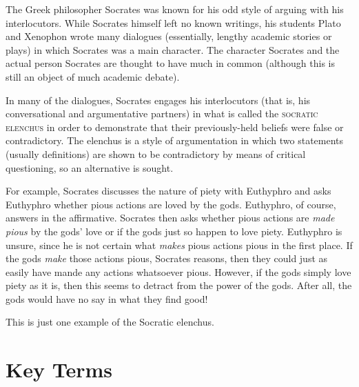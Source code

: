 The Greek philosopher Socrates was known for his odd style of arguing with his interlocutors. While Socrates himself left no known writings, his students Plato and Xenophon wrote many dialogues (essentially, lengthy academic stories or plays) in which Socrates was a main character. The character Socrates and the actual person Socrates are thought to have much in common (although this is still an object of much academic debate).

In many of the dialogues, Socrates engages his interlocutors (that is, his conversational and argumentative partners) in what is called the \textsc{\Gls{socratic elenchus}} \label{def:socraticelenchus} in order to demonstrate that their previously-held beliefs were false or contradictory. The elenchus is a style of argumentation in which two statements (usually definitions) are shown to be contradictory by means of critical questioning, so an alternative is sought.

For example, Socrates discusses the nature of piety with Euthyphro and asks Euthyphro whether pious actions are loved by the gods. Euthyphro, of course, answers in the affirmative. Socrates then asks whether pious actions are \emph{made pious} by the gods' love or if the gods just so happen to love piety. Euthyphro is unsure, since he is not certain what \emph{makes} pious actions pious in the first place. If the gods \emph{make} those actions pious, Socrates reasons, then they could just as easily have mande any actions whatsoever pious. However, if the gods simply love piety as it is, then this seems to detract from the power of the gods. After all, the gods would have no say in what they find good!

This is just one example of the Socratic elenchus.

\section*{Key Terms}
\begin{fullwidth}
\begin{multicols}{2}
\begin{sortedlist}
\end{sortedlist}
\end{multicols}
\end{fullwidth}
